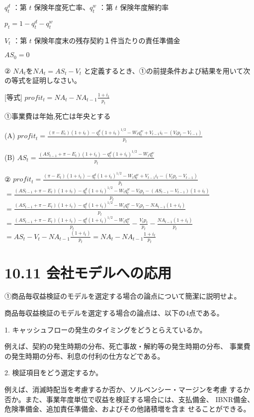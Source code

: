 \documentclass[report,gutter=10mm,fore-edge=10mm,uplatex,dvipdfmx]{jlreq}
\begin{document}
$q^d_t$ ：第 $t$ 保険年度死亡率、$q^w_t$ ：第 $t$ 保険年度解約率

$p_t = 1 - q^d_t - q^w_t$

$V_t$ ：第 $t$ 保険年度末の残存契約１件当たりの責任準備金

$AS_0=0$

② $NA_t$を$NA_t=AS_t-V_t$ と定義するとき、①の前提条件および結果を用いて次の等式を証明しなさい。

[等式]
$profit_t=NA_t-NA_{t-1}\frac{1+i_t}{p_t}$

\answer{}

①事業費は年始,死亡は年央とする

(A) $profit_t=\frac{(\pi-E_t)(1+i_t)-q^d_t(1+i_t)^{1/2}-W_tq_t^w+V_{t-1}i_t-(V_tp_t-V_{t-1})}{p_t}$

(B) $AS_t = \frac{(AS_{t-1}+\pi-E_t)(1+i_t)-q^d_t(1+i_t)^{1/2}-W_tq^w_t}{p_t}$

②
$profit_t=\frac{(\pi-E_t)(1+i_t)-q^d_t(1+i_t)^{1/2}-W_tq_t^w+V_{t-1}i_t-(V_tp_t-V_{t-1})}{p_t}$\\
$= \frac{(AS_{t-1}+\pi-E_t)(1+i_t)-q^d_t(1+i_t)^{1/2}-W_tq_t^w-V_tp_t-(AS_{t-1}-V_{t-1})(1+i_t)}{p_t}$\\
$= \frac{(AS_{t-1}+\pi-E_t)(1+i_t)-q^d_t(1+i_t)^{1/2}-W_tq_t^w-V_tp_t-NA_{t-1}(1+i_t)}{p_t}$\\
$= \frac{(AS_{t-1}+\pi-E_t)(1+i_t)-q^d_t(1+i_t)^{1/2}-W_tq_t^w}{p_t}-\frac{V_tp_t}{p_t}-\frac{NA_{t-1}(1+i_t)}{p_t}$\\
$= AS_t-V_t-NA_{t-1}\frac{(1+i_t)}{p_t} = NA_t - NA_{t-1}\frac{1+i_t}{p_t}$


\section{10.11 会社モデルへの応用}

①商品毎収益検証のモデルを選定する場合の論点について簡潔に説明せよ。

\answer{}
商品毎収益検証のモデルを選定する場合の論点は、以下の4点である。

1. キャッシュフローの発生のタイミングをどうとらえているか。

例えば、契約の発生時期の分布、死亡事故・解約等の発生時期の分布、
事業費の発生時期の分布、利息の付利の仕方などである。

2. 検証項目をどう選定するか。

例えば、消滅時配当を考慮するか否か、ソルベンシー・マージンを考慮
するか否か。また、事業年度単位で収益を検証する場合には、支払備金、
IBNR備金、危険準備金、追加責任準備金、およびその他諸積増を含ま
せることができる。
\end{document}
